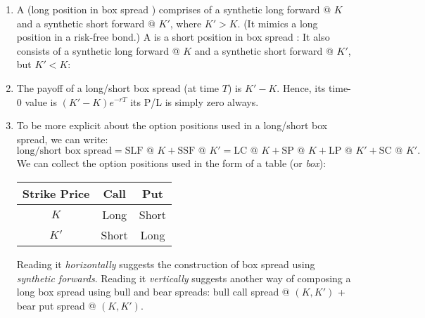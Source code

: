 \begin{enumerate}
\item A  (long position in box spread ) comprises
of a synthetic long forward @ \(K\) and a synthetic short forward @ \(K'\),
where \(K'>K\). (It mimics a long position in a risk-free bond.) A  is a short position in box spread : It also consists of
a synthetic long forward @ \(K\) and a synthetic short forward @ \(K'\), but
\(K'<K\):
\begin{center}
\end{center}

\item The payoff of a long/short box spread (at time \(T\)) is \(K'-K\). Hence,
its time-0 value is \((K'-K)e^{-rT}\)  its P/L is simply
zero always.

\item To be more explicit about the option positions used in a long/short box
spread, we can write:
\[
\text{long/short box spread}
= \text{SLF @ \(K\)} + \text{SSF @ \(K'\)} 
= \text{LC @ \(K\)} + \text{SP @ \(K\)} + \text{LP @ \(K'\)} + \text{SC @ \(K'\)}.
\]
We can collect the option positions used in the form of a table (or
\emph{box}):
\begin{center}
\begin{tabular}{ccc}
\toprule
Strike Price&Call&Put\\
\midrule
\(K\)&Long&Short\\
\(K'\)&Short&Long\\
\bottomrule
\end{tabular}
\end{center}
Reading it \emph{horizontally} suggests the construction of box spread using
\emph{synthetic forwards}. Reading it \emph{vertically} suggests another way of
composing a long box spread using bull and bear spreads: bull call spread
@ \((K,K')\) + bear put spread @ \((K,K')\).


\end{enumerate}
